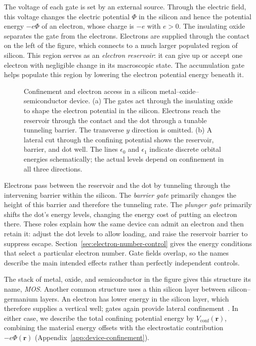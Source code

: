 The voltage of each gate is set by an external source. Through the
electric field, this voltage changes the electric potential $\Phi$
in the silicon and hence the potential energy $-e\Phi$ of an electron,
whose charge is $-e$ with $e>0$. The insulating oxide separates the
gate from the electrons. Electrons are supplied through the contact
on the left of the figure, which connects to a much larger populated
region of silicon. This region serves as an \emph{electron reservoir}:
it can give up or accept one electron with negligible change in its
macroscopic state. The accumulation gate helps populate this region
by lowering the electron potential energy beneath it.

\begin{figure}[!t]
 \centering
 
 \caption{Confinement and electron access in a silicon
 metal--oxide--semiconductor device. (a) The gates act through the
 insulating oxide to shape the electron potential in the silicon.
 Electrons reach the reservoir through the contact and the dot
 through a tunable tunneling barrier. The transverse $y$ direction
 is omitted. (b) A lateral cut through the confining potential shows
 the reservoir, barrier, and dot well. The lines $\epsilon_0$ and
 $\epsilon_1$ indicate discrete orbital energies schematically;
 the actual levels depend on confinement in all three directions.}
 \label{fig:platform-device-section}
\end{figure}
\FloatBarrier

Electrons pass between the reservoir and the dot by tunneling through
the intervening barrier within the silicon. The \emph{barrier gate}
primarily changes the height of this barrier and therefore the
tunneling rate. The \emph{plunger gate} primarily shifts the dot's
energy levels, changing the energy cost of putting an electron there.
These roles explain how the same device can admit an electron and
then retain it: adjust the dot levels to allow loading, and raise
the reservoir barrier to suppress escape. Section~\ref{sec:electron-number-control}
gives the energy conditions that select a particular electron number.
Gate fields overlap, so the names describe the main intended effects
rather than perfectly independent controls.

The stack of metal, oxide, and semiconductor in the figure gives this
structure its name, \emph{MOS}. Another common structure uses a thin
silicon layer between silicon--germanium layers. An electron has lower
energy in the silicon layer, which therefore supplies a vertical well;
gates again provide lateral confinement~\cite{Zajac2015}. In either
case, we describe the total confining potential energy by
$V_{\mathrm{conf}}(\mathbf r)$, combining the material energy offsets
with the electrostatic contribution $-e\Phi(\mathbf r)$
(Appendix~\ref{app:device-confinement}).

